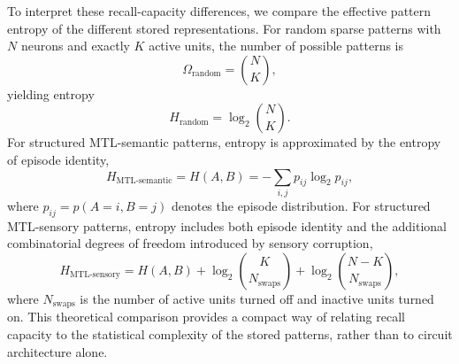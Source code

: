 \documentclass{article}
\begin{document}
\newline\newline
To interpret these recall-capacity differences, we compare the effective pattern entropy of the different stored representations. For random sparse patterns with $N$ neurons and exactly $K$ active units, the number of possible patterns is
\begin{equation}
\Omega_{\mathrm{random}} = \binom{N}{K},
\end{equation}
yielding entropy
\begin{equation}
H_{\mathrm{random}} = \log_2 \binom{N}{K}.
\end{equation}
For structured MTL-semantic patterns, entropy is approximated by the entropy of episode identity,
\begin{equation}
H_{\mathrm{MTL\text{-}semantic}} = H(A,B)
= - \sum_{i,j} p_{ij}\log_2 p_{ij},
\end{equation}
where $p_{ij}=p(A=i,B=j)$ denotes the episode distribution. For structured MTL-sensory patterns, entropy includes both episode identity and the additional combinatorial degrees of freedom introduced by sensory corruption,
\begin{equation}
H_{\mathrm{MTL\text{-}sensory}}
=
H(A,B)
+
\log_2 \binom{K}{N_{\mathrm{swaps}}}
+
\log_2 \binom{N-K}{N_{\mathrm{swaps}}},
\end{equation}
where $N_{\mathrm{swaps}}$ is the number of active units turned off and inactive units turned on. This theoretical comparison provides a compact way of relating recall capacity to the statistical complexity of the stored patterns, rather than to circuit architecture alone.
\end{document}
